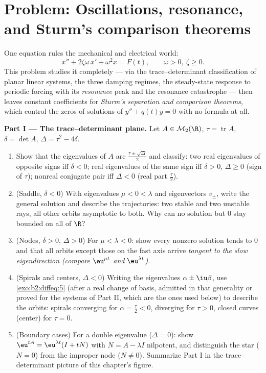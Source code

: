 \section{Problem: Oscillations, resonance, and Sturm's
comparison theorems}

\begin{problem}\label{pb:b2:diffeq:1}
One equation rules the mechanical and electrical world:
\[
x'' + 2\zeta\omega\,x' + \omega^2 x = F(t),
\qquad \omega > 0,\ \zeta \geq 0 .
\]
This problem studies it completely --- via the
trace--determinant classification of planar linear systems,
the three damping regimes, the steady-state response to
periodic forcing with its \emph{resonance}
peak and the resonance catastrophe --- then leaves constant
coefficients for \emph{Sturm's separation and comparison
theorems}, which control the
zeros of solutions of $y'' + q(t)y = 0$ with no formula at
all.

\medskip
\noindent\textbf{Part I --- The trace--determinant plane.} Let
$A \in \mathcal M_2(\R)$, $\tau = \operatorname{tr}A$, $\delta
= \det A$, $\Delta = \tau^2 - 4\delta$.
\begin{enumerate}
  \item Show that the eigenvalues of $A$ are
        $\frac{\tau\pm\sqrt\Delta}{2}$ and classify: two real
        eigenvalues of opposite signs iff $\delta < 0$; real
        eigenvalues of the same sign iff $\delta > 0$, $\Delta
        \geq 0$ (sign of $\tau$); nonreal conjugate pair iff
        $\Delta < 0$ (real part $\frac\tau2$).
  \item (Saddle, $\delta < 0$) With eigenvalues $\mu < 0 <
        \lambda$ and eigenvectors $v_\pm$, write the general
        solution and describe the trajectories: two stable and
        two unstable rays, all other orbits asymptotic to
        both. Why can no solution but $0$ stay bounded on all
        of $\R$?
  \item (Nodes, $\delta > 0$, $\Delta > 0$) For $\mu < \lambda
        < 0$: show every nonzero solution tends to $0$ and
        that all orbits except those on the fast axis arrive
        \emph{tangent to the slow eigendirection}
        \emph{(compare $\eu^{\mu t}$ and $\eu^{\lambda t}$)}.
  \item (Spirals and centers, $\Delta < 0$) Writing the
        eigenvalues $\alpha \pm \iu\beta$, use
        \cref{exo:b2:diffeq:5} (after a real change of basis,
        admitted in that generality or proved for the systems
        of Part II, which are the ones used below) to describe
        the orbits: spirals converging for $\alpha =
        \frac\tau2 < 0$, diverging for $\tau > 0$, closed
        curves (center) for $\tau = 0$.
  \item (Boundary cases) For a double eigenvalue ($\Delta =
        0$): show $\eu^{tA} = \eu^{\lambda t}(I + tN)$ with $N
        = A - \lambda I$ nilpotent, and distinguish the star
        ($N = 0$) from the improper node ($N \neq 0$).
        Summarize Part I in the trace--determinant picture of
        this chapter's figure.
\end{enumerate}


\end{problem}

